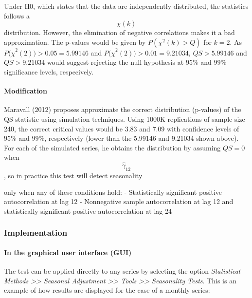 \documentclass[
  letterpaper,
  DIV=11,
  numbers=noendperiod]{scrreprt}
\let\oldparagraph\paragraph
\renewcommand{\paragraph}[1]{\oldparagraph{#1}\mbox{}}
\begin{document}
Under H0, which states that the data are independently distributed, the
statistics follows a \[\chi \left(k\right)\] distribution. However, the
elimination of negative correlations makes it a bad approximation. The
p-values would be given by \(P(\chi^{2}\left( k \right) > Q)\) for
\(k = 2\). As \({P(\chi}^{2}(2)) > 0.05 = 5.99146\) and
\({P(\chi}^{2}(2)) > 0.01 = 9.21034\), \(QS > 5.99146\) and
\(QS > 9.21034\) would suggest rejecting the null hypothesis at \(95\%\)
and \(99\%\) significance levels, respecively.

\hypertarget{modification}{%
\paragraph{Modification}\label{modification}}

Maravall (2012) proposes approximate the correct distribution (p-values)
of the QS statistic using simulation techniques. Using 1000K
replications of sample size 240, the correct critical values would be
3.83 and 7.09 with confidence levels of \(95\%\) and \(99\%\),
respectively (lower than the 5.99146 and 9.21034 shown above). For each
of the simulated series, he obtains the distribution by assuming
\(QS=0\) when \[\hat\gamma_{12}\], so in practice this test will detect
seasonality

only when any of these conditions hold: - Statistically significant
positive autocorrelation at lag 12 - Nonnegative sample autocorrelation
at lag 12 and statistically significant positive autocorrelation at lag
24

\hypertarget{implementation}{%
\subsubsection{Implementation}\label{implementation}}

\hypertarget{in-the-graphical-user-interface-gui}{%
\paragraph{In the graphical user interface
(GUI)}\label{in-the-graphical-user-interface-gui}}

The test can be applied directly to any series by selecting the option
\emph{Statistical Methods \textgreater\textgreater{} Seasonal Adjustment
\textgreater\textgreater{} Tools \textgreater\textgreater{} Seasonality
Tests}. This is an example of how results are displayed for the case of
a monthly series:
\end{document}
